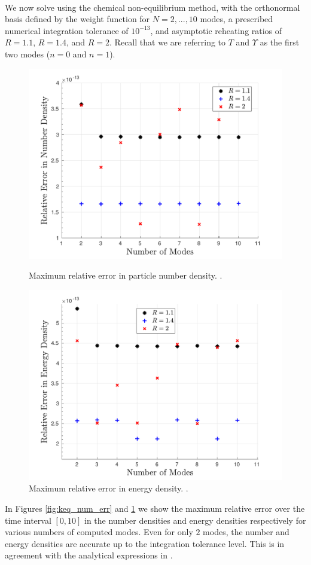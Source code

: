 \\
We now solve   using the chemical non-equilibrium method, with the orthonormal basis defined by the weight function  for $N=2,...,10$ modes, a prescribed numerical integration tolerance of $10^{-13}$, and asymptotic reheating ratios of $R=1.1$, $R=1.4$, and $R=2$.  Recall that we are referring to $T$ and $\Upsilon$ as the first two modes ($n=0$ and $n=1$). 
\begin{figure}[ht]
\centerline{\includegraphics[width=0.9\linewidth]{06-appendix/SpectralMethodBoltzmann/Figures/keq_num_err.pdf}}
\caption{Maximum relative error in particle number density. .}\label{fig:keq_num_err}
 \centerline{\includegraphics[width=0.9\linewidth]{06-appendix/SpectralMethodBoltzmann/Figures/keq_E_err.pdf}}
\caption{Maximum relative error in energy density. .}\label{fig:keq_E_err}
\end{figure}
In Figures \ref{fig:keq_num_err} and  \ref{fig:keq_E_err} we show the maximum relative error over the time interval $[0,10]$ in the number densities and energy densities respectively for various numbers of computed modes. Even for only $2$ modes, the number and energy densities are accurate up to the integration tolerance level.  This is in agreement with the analytical expressions in .



